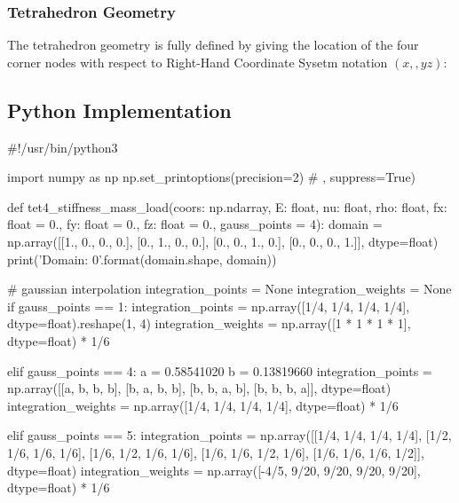 \documentclass[10pt,b5paper,titlepage]{book}
\begin{document}
\subsubsection{Tetrahedron Geometry}

The tetrahedron geometry is fully defined by giving the location of the four
corner nodes with respect to Right-Hand Coordinate Sysetm notation $ (x, ,y z) $:




\subsection{Python Implementation}
\begin{python}
#!/usr/bin/python3

import numpy as np
np.set_printoptions(precision=2) # , suppress=True)

def tet4_stiffness_mass_load(coors: np.ndarray,
                             E: float,
                             nu: float,
                             rho: float,
                             fx: float = 0.,
                             fy: float = 0.,
                             fz: float = 0.,
                             gauss_points = 4):
    domain = np.array([[1., 0., 0., 0.],
                       [0., 1., 0., 0.],
                       [0., 0., 1., 0.],
                       [0., 0., 0., 1.]], dtype=float)
    print('Domain: {0}'.format(domain.shape, domain))

    # gaussian interpolation
    integration_points = None
    integration_weights = None
    if gauss_points == 1:
        integration_points = np.array([1/4, 1/4, 1/4, 1/4],
                                      dtype=float).reshape(1, 4)
        integration_weights = np.array([1 * 1 * 1 * 1],
                                       dtype=float) * 1/6

    elif gauss_points == 4:
        a = 0.58541020
        b = 0.13819660
        integration_points = np.array([[a, b, b, b],
                                       [b, a, b, b],
                                       [b, b, a, b],
                                       [b, b, b, a]], dtype=float)
        integration_weights = np.array([1/4, 1/4, 1/4, 1/4],
                                       dtype=float) * 1/6

    elif gauss_points == 5:
        integration_points = np.array([[1/4, 1/4, 1/4, 1/4],
                                       [1/2, 1/6, 1/6, 1/6],
                                       [1/6, 1/2, 1/6, 1/6],
                                       [1/6, 1/6, 1/2, 1/6],
                                       [1/6, 1/6, 1/6, 1/2]], dtype=float)
        integration_weights = np.array([-4/5, 9/20, 9/20, 9/20, 9/20],
                                       dtype=float) * 1/6


\end{python}
\end{document}
